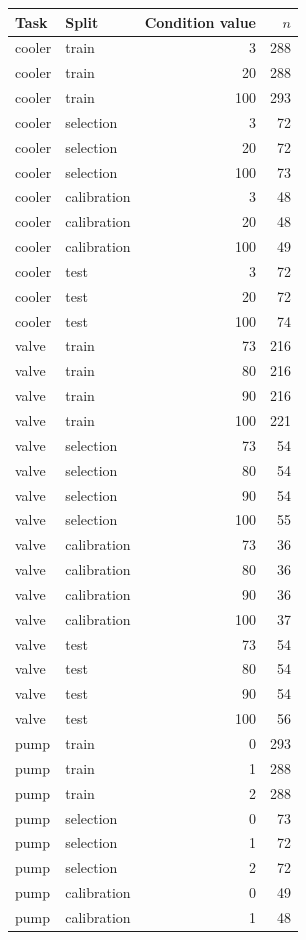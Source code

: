 \begin{tabular}{llrr}
\toprule
Task & Split & Condition value & $n$\\
\midrule
cooler & train & 3 & 288\\
cooler & train & 20 & 288\\
cooler & train & 100 & 293\\
cooler & selection & 3 & 72\\
cooler & selection & 20 & 72\\
cooler & selection & 100 & 73\\
cooler & calibration & 3 & 48\\
cooler & calibration & 20 & 48\\
cooler & calibration & 100 & 49\\
cooler & test & 3 & 72\\
cooler & test & 20 & 72\\
cooler & test & 100 & 74\\
valve & train & 73 & 216\\
valve & train & 80 & 216\\
valve & train & 90 & 216\\
valve & train & 100 & 221\\
valve & selection & 73 & 54\\
valve & selection & 80 & 54\\
valve & selection & 90 & 54\\
valve & selection & 100 & 55\\
valve & calibration & 73 & 36\\
valve & calibration & 80 & 36\\
valve & calibration & 90 & 36\\
valve & calibration & 100 & 37\\
valve & test & 73 & 54\\
valve & test & 80 & 54\\
valve & test & 90 & 54\\
valve & test & 100 & 56\\
pump & train & 0 & 293\\
pump & train & 1 & 288\\
pump & train & 2 & 288\\
pump & selection & 0 & 73\\
pump & selection & 1 & 72\\
pump & selection & 2 & 72\\
pump & calibration & 0 & 49\\
pump & calibration & 1 & 48\\

\end{tabular}
